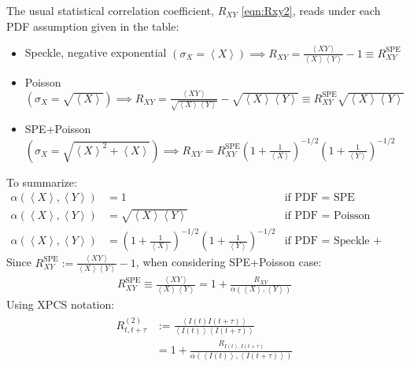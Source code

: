 \documentclass[11pt]{article}
\theoremstyle{definition}
\begin{document}
The usual statistical correlation coefficient, $R_{XY}$ \eqref{eqn:Rxy2}, reads under each PDF assumption given in the table:
\begin{itemize}[label=$\diamond$]
    \item Speckle, negative exponential $\left(\sigma_X = \left<X\right>\right) \implies R_{XY} = \frac{\left< X Y \right>}{\left<X\right> \left<Y\right>} - 1 \equiv R_{XY}^\text{SPE}$
    \item Poisson $\left(\sigma_X = \sqrt{\left<X\right>}\right) \implies R_{XY} = \frac{\left< X Y \right>}{\sqrt{\left<X\right> \left<Y\right>}} - \sqrt{\left<X\right>\left<Y\right>} \equiv R_{XY}^{\text{SPE}}  \sqrt{\left<X\right> \left<Y\right>}$
    \item SPE+Poisson $\left(\sigma_X = \sqrt{\left<X\right>^2 + \left<X\right>} \right) \implies R_{XY} = R_{XY}^{\text{SPE}} \left(1+\frac{1}{\left<X\right>}\right)^{-1/2} \left(1+\frac{1}{\left<Y\right>}\right)^{-1/2}$
\end{itemize}
To summarize: 
\begin{align}
\alpha(\left<X\right>, \left<Y\right>) &= 1 & \text{if PDF = SPE} \\
\alpha(\left<X\right>, \left<Y\right>) &= \sqrt{\left<X\right>\left<Y\right>} & \text{if PDF = Poisson} \\
\alpha(\left<X\right>, \left<Y\right>) &= \left(1+\frac{1}{\left<X\right>}\right)^{-1/2} \left(1+\frac{1}{\left<Y\right>}\right)^{-1/2} & \text{if PDF = Speckle + Poisson}
\end{align}
Since $R_{XY}^{\text{SPE}} := \frac{\left\langle XY \right\rangle}{\left<X\right> \left<Y\right>} - 1$, when considering SPE+Poisson case:
\begin{align}\label{eqn:Rxy2_final}
R^{\text{SPE}}_{X Y} \equiv \frac{\left< XY \right>}{\left<X\right>\left<Y\right>} = 1  + \frac{R_{XY}}{\alpha (\left<X\right>, \left<Y\right>)}
\end{align}
Using XPCS notation: 
\begin{align}
\label{eqn:xpcs_corr}
\begin{split}
R^{(2)}_{t, t+\tau} &:= \frac{\left< I(t) I(t+\tau) \right> }{\left<I(t)\right> \left<I(t+\tau)\right>} \\
&= 1 + \frac{R_{I(t), I(t+\tau)}}{\alpha \left(\left<I(t)\right>,\left<I(t+\tau)\right>\right)}
\end{split}
\end{align}
\end{document}
